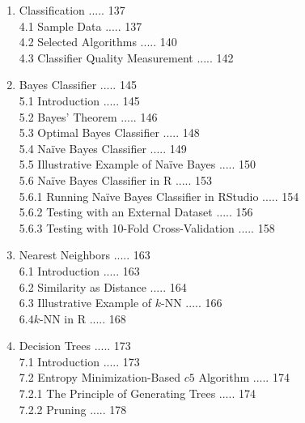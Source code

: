 \documentclass[10pt]{book}
\begin{document}
\begin{enumerate}
3.14.3 Normalization Factor ..... 111\\
3.15 Common Formats for Storing Structured Data ..... 114\\
3.15.1 Attribute-Relation File Format (ARFF) ..... 114\\
3.15.2 Comma-Separated Values (CSV) ..... 115\\
3.15.3 C5 format ..... 117\\
3.15.4 Matrix Files for CLUTO ..... 121\\
3.15.5 SVMlight Format ..... 121\\
3.15.6 Reading Data in R ..... 122\\
3.16 A Complex Example ..... 123
  \item Classification ..... 137\\
4.1 Sample Data ..... 137\\
4.2 Selected Algorithms ..... 140\\
4.3 Classifier Quality Measurement ..... 142
  \item Bayes Classifier ..... 145\\
5.1 Introduction ..... 145\\
5.2 Bayes' Theorem ..... 146\\
5.3 Optimal Bayes Classifier ..... 148\\
5.4 Naïve Bayes Classifier ..... 149\\
5.5 Illustrative Example of Naïve Bayes ..... 150\\
5.6 Naïve Bayes Classifier in R ..... 153\\
5.6.1 Running Naïve Bayes Classifier in RStudio ..... 154\\
5.6.2 Testing with an External Dataset ..... 156\\
5.6.3 Testing with 10-Fold Cross-Validation ..... 158
  \item Nearest Neighbors ..... 163\\
6.1 Introduction ..... 163\\
6.2 Similarity as Distance ..... 164\\
6.3 Illustrative Example of $k$-NN ..... 166\\
$6.4 k$-NN in R ..... 168
  \item Decision Trees ..... 173\\
7.1 Introduction ..... 173\\
7.2 Entropy Minimization-Based $c 5$ Algorithm ..... 174\\
7.2.1 The Principle of Generating Trees ..... 174\\
7.2.2 Pruning ..... 178\\

\end{enumerate}
\end{document}
